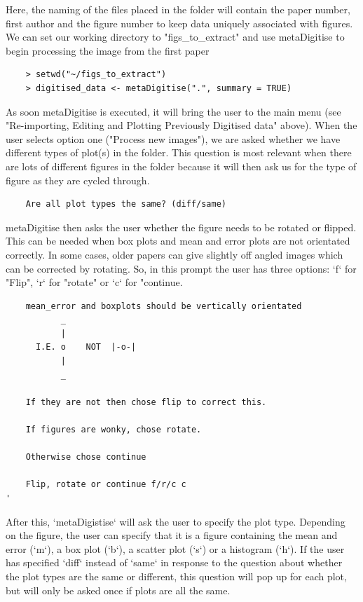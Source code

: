 \documentclass{article}
\begin{document}
Here, the naming of the files placed in the folder will contain the paper number, first author and the figure number to keep data uniquely associated with figures. We can set our working directory to "figs\_to\_extract" and use metaDigitise to begin processing the image from the first paper

\begin{verbatim}
	> setwd("~/figs_to_extract")
	> digitised_data <- metaDigitise(".", summary = TRUE)
\end{verbatim}

As soon metaDigitise is executed, it will bring the user to the main menu (see "Re-importing, Editing and Plotting Previously Digitised data" above). When the user selects option one ("Process new images"), we are asked whether we have different types of plot(s) in the folder. This question is most relevant when there are lots of different figures in the folder because it will then ask us for the type of figure as they are cycled through.

\begin{lstlisting}
	Are all plot types the same? (diff/same)
\end{lstlisting}

metaDigitise then asks the user whether the figure needs to be rotated or flipped. This can be needed when box plots and mean and error plots are not orientated correctly. In some cases, older papers can give slightly off angled images which can be corrected by rotating. So, in this prompt the user has three options: `f` for "Flip", `r` for "rotate" or `c` for "continue. 

\begin{lstlisting}
	mean_error and boxplots should be vertically orientated
	       _ 
	       |  
	  I.E. o    NOT  |-o-|
	       |
	       _

	If they are not then chose flip to correct this.

	If figures are wonky, chose rotate.

	Otherwise chose continue

	Flip, rotate or continue f/r/c c
'\end{lstlisting}

After this, `metaDigistise` will ask the user to specify the plot type. Depending on the figure, the user can specify that it is a figure containing the mean and error (`m`), a box plot (`b`), a scatter plot (`s`) or a histogram (`h`). If the user has specified `diff` instead of `same` in response to the question about whether the plot types are the same or different, this question will pop up for each plot, but will only be asked once if plots are all the same. 
\end{document}
